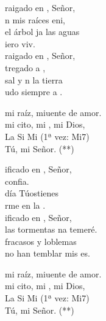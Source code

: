 \begin{cancion}[Tú, mi raíz][Ixcís]%
	raigado en , Señor,\\
	n mis raíces eni,\\
	 el árbol ja las aguas\\
	iero viv.\\
	\jump
	raigado en , Señor,\\
	tregado a ,\\
	 sal y n la tierra\\
	udo siempre a .\jump\\
	\begin{chorus}%
		 mi raíz, miuente de amor. \\
		 mi cito, mi , mi Dios, \\
	La Si    Mi    (1ª vez: Mi7)\\
	Tú, mi Señor. (**)\jump\\
	\end{chorus}%
	ificado en , Señor,\\
	 confia. \\
	 día Túostienes \\
	rme en la .\\
	\jump
	ificado en , Señor,\\
	 las tormentas na temeré.\\
	fracasos y loblemas\\
	no han temblar mis es. \jump\\
	\begin{chorus}%
		 mi raíz, miuente de amor. \\
		 mi cito, mi , mi Dios, \\
	La Si    Mi    (1ª vez: Mi7)\\
	Tú, mi Señor. (**)\jump\\
	\end{chorus}%
\end{cancion}%
